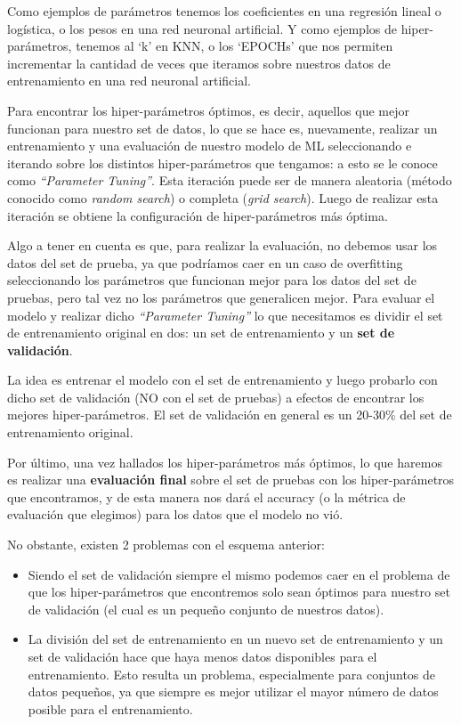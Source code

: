 \documentclass[12pt,a4paper]{article}
\begin{document}
\begin{sloppypar}
\begin{itemize}
Como ejemplos de parámetros tenemos los coeficientes en una regresión lineal o logística, o los pesos en una red neuronal artificial. Y como ejemplos de hiper-parámetros, tenemos al ‘k’ en KNN, o los ‘EPOCHs’ que nos permiten incrementar la cantidad de veces que iteramos sobre nuestros datos de entrenamiento en una red neuronal artificial. 

Para encontrar los hiper-parámetros óptimos, es decir, aquellos que mejor funcionan para nuestro set de datos, lo que se hace es, nuevamente, realizar un entrenamiento y una evaluación de nuestro modelo de ML seleccionando e iterando sobre los distintos hiper-parámetros que tengamos: a esto se le conoce como \textit{“Parameter Tuning”}. Esta iteración puede ser de manera aleatoria (método conocido como \textit{random search}) o completa (\textit{grid search}). Luego de realizar esta iteración se obtiene la configuración de hiper-parámetros más óptima.

Algo a tener en cuenta es que, para realizar la evaluación, no debemos usar los datos del set de prueba, ya que podríamos caer en un caso de overfitting seleccionando los parámetros que funcionan mejor para los datos del set de pruebas, pero tal vez no los parámetros que generalicen mejor. Para evaluar el modelo y realizar dicho \textit{“Parameter Tuning”} lo que necesitamos es dividir el set de entrenamiento original en dos: un set de entrenamiento y un \textbf{set de validación}. 

La idea es entrenar el modelo con el set de entrenamiento y luego probarlo con dicho set de validación (NO con el set de pruebas) a efectos de encontrar los mejores hiper-parámetros. El set de validación en general es un 20-30\% del set de entrenamiento original.

Por último, una vez hallados los hiper-parámetros más óptimos, lo que haremos es realizar una \textbf{evaluación final} sobre el set de pruebas con los hiper-parámetros que encontramos, y de esta manera nos dará el accuracy (o la métrica de evaluación que elegimos) para los datos que el modelo no vió.

No obstante, existen 2 problemas con el esquema anterior:
\begin{itemize}
\item Siendo el set de validación siempre el mismo podemos caer en el problema de que los hiper-parámetros que encontremos solo sean óptimos para nuestro set de validación (el cual es un pequeño conjunto de nuestros datos).
\item La división del set de entrenamiento en un nuevo set de entrenamiento y un set de validación hace que haya menos datos disponibles para el entrenamiento. Esto resulta un problema, especialmente para conjuntos de datos pequeños, ya que siempre es mejor utilizar el mayor número de datos posible para el entrenamiento.
\end{itemize}


\end{itemize}
\end{sloppypar}
\end{document}
